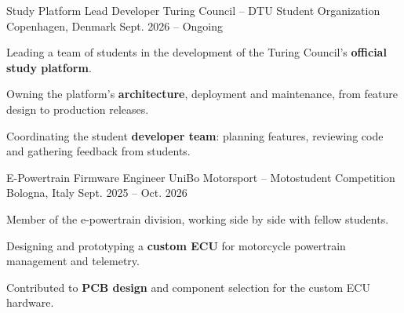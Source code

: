 

\begin{cventries}

\cventry
    {Study Platform Lead Developer} %
    {Turing Council -- DTU Student Organization} %
    {Copenhagen, Denmark} %
    {Sept. 2026 -- Ongoing} %
    {
    \begin{cvitems} %
        \item {Leading a team of students in the development of the Turing Council's \textbf{official study platform}.}
        \item {Owning the platform's \textbf{architecture}, deployment and maintenance, from feature design to production releases.}
        \item {Coordinating the student \textbf{developer team}: planning features, reviewing code and gathering feedback from students.}
    \end{cvitems}
    }

\cventry
    {E-Powertrain Firmware Engineer} %
    {UniBo Motorsport -- Motostudent Competition} %
    {Bologna, Italy} %
    {Sept. 2025 -- Oct. 2026} %
    {
    \begin{cvitems} %
        \item {Member of the e-powertrain division, working side by side with fellow students.}
        \item {Designing and prototyping a \textbf{custom ECU} for motorcycle powertrain management and telemetry.}
        \item {Contributed to \textbf{PCB design} and component selection for the custom ECU hardware.}
    \end{cvitems}
    }


\end{cventries}
